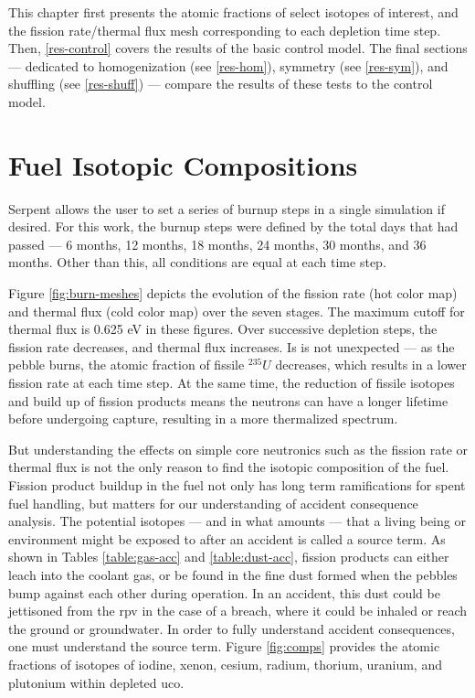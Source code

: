 This chapter first presents the atomic fractions of select isotopes of interest, and the fission rate/thermal flux mesh corresponding to each depletion time step.  Then, \autoref{res-control} covers the results of the basic control model. The final sections --- dedicated to homogenization (see \autoref{res-hom}), symmetry (see \autoref{res-sym}), and shuffling (see \autoref{res-shuff}) --- compare the results of these tests to the control model.

\section{Fuel Isotopic Compositions}

Serpent allows the user to set a series of burnup steps in a single simulation if desired.  For this work, the burnup steps were defined by the total days that had passed --- 6 months, 12 months, 18 months, 24 months, 30 months, and 36 months.  Other than this, all conditions are equal at each time step.



Figure \ref{fig:burn-meshes} depicts the evolution of the fission rate (hot color map) and thermal flux (cold color map) over the seven stages.  The maximum cutoff for thermal flux is 0.625 eV in these figures.  Over successive depletion steps, the fission rate decreases, and thermal flux increases.  Is is not unexpected --- as the pebble burns, the atomic fraction of fissile $^235U$ decreases, which results in a lower fission rate at each time step.  At the same time, the reduction of fissile isotopes and build up of fission products means the neutrons can have a longer lifetime before undergoing capture, resulting in a more thermalized spectrum.

But understanding the effects on simple core neutronics such as the fission rate or thermal flux is not the only reason to find the isotopic composition of the fuel.  Fission product buildup in the fuel not only has long term ramifications for spent fuel handling, but matters for our understanding of accident consequence analysis.  The potential isotopes --- and in what amounts --- that a living being or environment might be exposed to after an accident is called a source term.  As shown in Tables \ref{table:gas-acc} and \ref{table:dust-acc}, fission products can either leach into the coolant gas, or be found in the fine dust formed when the pebbles bump against each other during operation.  In an accident, this dust could be jettisoned from the \acrshort{rpv} in the case of a breach, where it could be inhaled or reach the ground or groundwater.  In order to fully understand accident consequences, one must understand the source term.  Figure \ref{fig:comps} provides the atomic fractions of isotopes of iodine, xenon, cesium, radium, thorium, uranium, and plutonium within depleted \acrshort{uco}.

